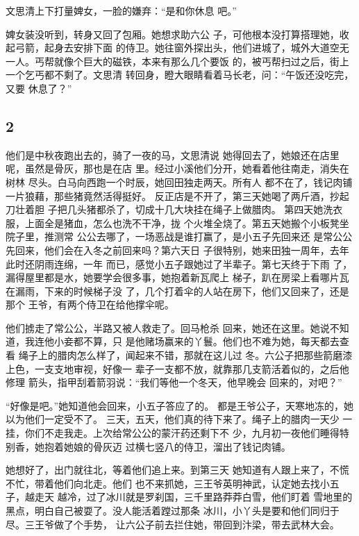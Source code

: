 文思清上下打量婢女，一脸的嫌弃：“是和你休息
吧。”

婢女装没听到，转身又回了包厢。她想求助六公
子，可他根本没打算搭理她，收起弓箭，起身去安排下面
的侍卫。她往窗外探出头，他们进城了，城外大道空无
一人。丐帮就像个巨大的磁铁，本来有那么几个要饭
的，被丐帮扫过之后，街上一个乞丐都不剩了。文思清
转回身，瞪大眼睛看着马长老，问：“午饭还没吃完，又要
休息了？”
\newline

{\centering\subsection{2}}

他们是中秋夜跑出去的，骑了一夜的马，文思清说
她得回去了，她娘还在店里呢，虽然是骨灰，那也是在店
里。经过小溪他们分开，她看着他往南走，消失在树林
尽头。白马向西跑一个时辰，她回田独走两天。所有人
都不在了，钱记肉铺一片狼藉，那些猪竟然活得挺好。
反正店是不开了，第三天她喝了两斤酒，抄起刀壮着胆
子把几头猪都杀了，切成十几大块挂在绳子上做腊肉。
第四天她洗衣服，上面全是猪血，怎么也洗不干净，拢
个火堆全烧了。第五天她搬个小板凳坐院子里，推测常
公公去哪了，一场恶战是谁打赢了，是小五子先回来还
是常公公先回来，他们会在入冬之前回来吗？第六天日
子很特别，她来田独一周年，去年此时还阴雨连绵，一年
而已，感觉小五子跟她过了半辈子。第七天终于下雨
了，漏得屋里都是水，她要学会很多事，她抱着新瓦爬上
梯子，趴在房梁上看哪片瓦在漏雨，下来的时候梯子没
了，几个打着伞的人站在房下，他们又回来了，还是那个
王爷，有两个侍卫在给他撑伞呢。

他们掳走了常公公，半路又被人救走了。回马枪杀
回来，她还在这里。她说不知道，我连他小妾都不算，只
是他赌场赢来的丫鬟。他们也不难为她，每天都去查看
绳子上的腊肉怎么样了，闻起来不错，那就在这儿过
冬。六公子把那些箭磨漆上色，一支支地审视，好像一
辈子一支都不放，就靠那几支箭活着似的，之后他修理
箭头，指甲刮着箭羽说：“我们等他一个冬天，他早晚会
回来的，对吧？”

“好像是吧。”她知道他会回来，小五子答应了的。
都是王爷公子，天寒地冻的，她以为他们一定受不了。
三天，五天，他们真的待下来了。绳子上的腊肉一天少
一挂，你们不走我走。上次给常公公的蒙汗药还剩下不
少，九月初一夜他们睡得特别香，她抱着她娘的骨灰迈
过横七竖八的侍卫，溜出了钱记肉铺。

她想好了，出门就往北，等着他们追上来。到第三天
她知道有人跟上来了，不慌不忙，带着他们向北走。他们
也不来抓她，三王爷英明神武，认定她去找小五子，越走天
越冷，过了冰川就是罗刹国，三千里路莽莽白雪，他们盯着
雪地里的黑点，明白自己被耍了。没人能活着蹚过那条
冰川，小丫头是要和他们同归于尽。三王爷做了个手势，
让六公子前去拦住她，带回到汴梁，带去武林大会。
\newline

